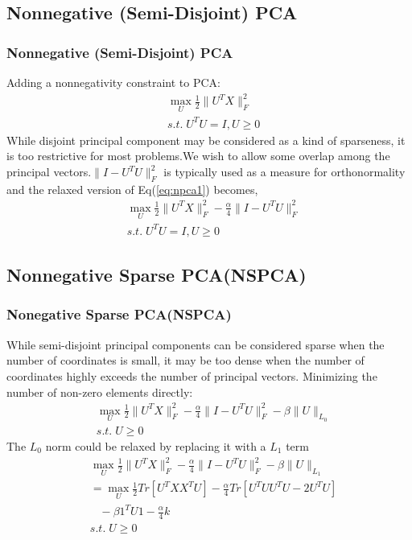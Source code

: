 \documentclass{beamer}
\begin{document}
\subsection{Nonnegative (Semi-Disjoint) PCA}
\begin{frame}\frametitle{Nonnegative (Semi-Disjoint) PCA}
Adding a nonnegativity constraint to PCA:
\begin{equation}\label{eq:npca1}
\begin{split}
&\max_U \frac{1}{2}\|U^TX\|_F^2\\
&s.t.\; U^TU=I,U\geq 0
\end{split}
\end{equation}
While disjoint principal component may be considered as a kind of sparseness, it is
too restrictive for most problems.We wish to allow some overlap among the principal vectors.$\parallel I-U^TU\parallel_F^2$ is typically used as a measure for orthonormality and the relaxed version of Eq(\ref{eq:npca1}) becomes,
\begin{equation}\label{eq:npca2}
\begin{split}
&\max_U \frac{1}{2}\|U^TX\|_F^2-\frac{\alpha}{4}\|I-U^TU\|_F^2\\
&s.t.\; U^TU=I,U\geq 0
\end{split}
\end{equation}
\end{frame}

\subsection{Nonnegative Sparse PCA(NSPCA)}
\begin{frame}\frametitle{Nonegative Sparse PCA(NSPCA)}
While semi-disjoint principal components can be considered sparse when the number of coordinates is small, it may be too dense when the number of coordinates highly exceeds the number of principal vectors. Minimizing the number of non-zero elements directly:
\begin{equation}\label{eq:nspca1}
\begin{split}
&\max_U \frac{1}{2}\|U^TX\|_F^2-\frac{\alpha}{4}\|I-U^TU\|_F^2-\beta\|U\|_{L_0}\\
&s.t.\;U\geq 0
\end{split}
\end{equation}
The $L_0$ norm could be relaxed by replacing it with a $L_1$ term
\begin{equation}\label{eq:nspca2}
\begin{split}
&\max_U \frac{1}{2}\|U^TX\|_F^2-\frac{\alpha}{4}\|I-U^TU\|_F^2-\beta\|U\|_{L_1}\\
&=\max_U \frac{1}{2}Tr[U^TXX^TU]-\frac{\alpha}{4}Tr[U^TUU^TU-2U^TU]\\
&\;\;\;-\beta 1^TU1-\frac{\alpha}{4}k\\
&s.t.\;U\geq 0
\end{split}
\end{equation}
\end{frame}
\end{document}
